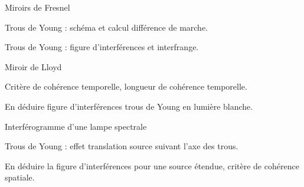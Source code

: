 
\Classe[PC]


{
    
    \begin{Exocolle}{Miroirs de Fresnel}
        \item Trous de Young : schéma et calcul différence de marche.
        \item Trous de Young  : figure d'interférences et interfrange.
    \end{Exocolle}
    
    \begin{Exocolle}{Miroir de Lloyd}
        \item Critère de cohérence temporelle, longueur de cohérence temporelle.
        \item En déduire figure d'interférences trous de Young en lumière blanche.
    \end{Exocolle}
    
    \begin{Exocolle}{Interférogramme d'une lampe spectrale}
    \item Trous de Young : effet translation source suivant l'axe des trous.
    \item En déduire la figure d'interférences pour une source étendue, critère de cohérence spatiale.
    \end{Exocolle}
}
